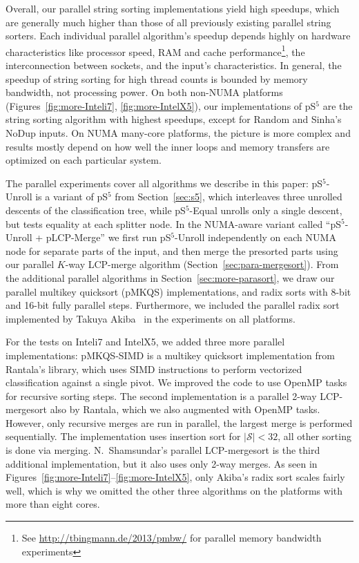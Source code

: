 \documentclass[a4paper]{myjournal}
\newcommand{\Strings}{\mathcal{S}}
\begin{document}
Overall, our parallel string sorting implementations yield high speedups, which
are generally much higher than those of all previously existing parallel string
sorters. Each individual parallel algorithm's speedup depends highly on hardware
characteristics like processor speed, RAM and cache performance\footnote{See
  \url{http://tbingmann.de/2013/pmbw/} for parallel memory bandwidth
  experiments}, the interconnection between sockets, and the input's
characteristics. In general, the speedup of string sorting for high thread
counts is bounded by memory bandwidth, not processing power.  On both non-NUMA
platforms (Figures~\ref{fig:more-Inteli7}, \ref{fig:more-IntelX5}), our
implementations of pS$^5$ are the string sorting algorithm with highest
speedups, except for Random and Sinha's NoDup inputs.  On NUMA many-core
platforms, the picture is more complex and results mostly depend on how well the
inner loops and memory transfers are optimized on each particular system.

The parallel experiments cover all algorithms we describe in this paper:
pS$^5$-Unroll is a variant of pS$^5$ from Section~\ref{sec:s5}, which
interleaves three unrolled descents of the classification tree, while
pS$^5$-Equal unrolls only a single descent, but tests equality at each splitter
node. In the NUMA-aware variant called ``pS$^5$-Unroll + pLCP-Merge'' we first
run pS$^5$-Unroll independently on each NUMA node for separate parts of the
input, and then merge the presorted parts using our parallel $K$-way LCP-merge
algorithm (Section~\ref{sec:para-mergesort}). From the additional parallel
algorithms in Section~\ref{sec:more-parasort}, we draw our parallel multikey
quicksort (pMKQS) implementations, and radix sorts with 8-bit and 16-bit fully
parallel steps.  Furthermore, we included the parallel radix sort implemented by
Ta\-kuya Akiba~\cite{akiba2011radixsort} in the experiments on all platforms.

For the tests on Inteli7 and IntelX5, we added three more parallel
implementations: pMKQS-SIMD is a multikey quicksort implementation from
Rantala's library, which uses SIMD instructions to perform vectorized
classification against a single pivot. We improved the code to use OpenMP tasks
for recursive sorting steps. The second implementation is a parallel 2-way
LCP-mergesort also by Rantala, which we also augmented with OpenMP
tasks. However, only recursive merges are run in parallel, the largest merge is
performed sequentially. The implementation uses insertion sort for $|\Strings| <
32$, all other sorting is done via merging. N.\ Shamsundar's parallel
LCP-mergesort is the third additional implementation, but it also uses only
2-way merges.  As seen in Figures~\ref{fig:more-Inteli7}--\ref{fig:more-IntelX5},
only Akiba's radix sort scales fairly well, which is why we omitted the other
three algorithms on the platforms with more than eight cores.
\end{document}
